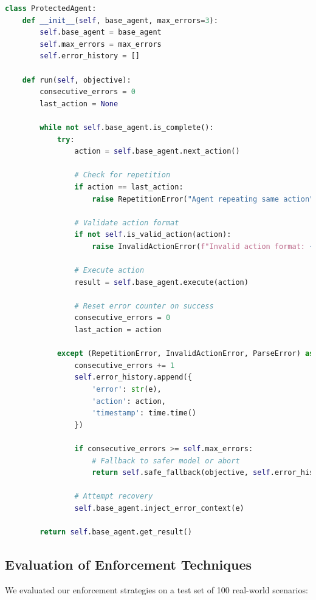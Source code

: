 \documentclass[11pt]{article}
\begin{document}
\begin{lstlisting}[language=Python, caption={Protected agent execution}]
class ProtectedAgent:
    def __init__(self, base_agent, max_errors=3):
        self.base_agent = base_agent
        self.max_errors = max_errors
        self.error_history = []
    
    def run(self, objective):
        consecutive_errors = 0
        last_action = None
        
        while not self.base_agent.is_complete():
            try:
                action = self.base_agent.next_action()
                
                # Check for repetition
                if action == last_action:
                    raise RepetitionError("Agent repeating same action")
                
                # Validate action format
                if not self.is_valid_action(action):
                    raise InvalidActionError(f"Invalid action format: {action}")
                
                # Execute action
                result = self.base_agent.execute(action)
                
                # Reset error counter on success
                consecutive_errors = 0
                last_action = action
                
            except (RepetitionError, InvalidActionError, ParseError) as e:
                consecutive_errors += 1
                self.error_history.append({
                    'error': str(e),
                    'action': action,
                    'timestamp': time.time()
                })
                
                if consecutive_errors >= self.max_errors:
                    # Fallback to safer model or abort
                    return self.safe_fallback(objective, self.error_history)
                
                # Attempt recovery
                self.base_agent.inject_error_context(e)
        
        return self.base_agent.get_result()
\end{lstlisting}

\subsection{Evaluation of Enforcement Techniques}

We evaluated our enforcement strategies on a test set of 100 real-world scenarios:
\end{document}

